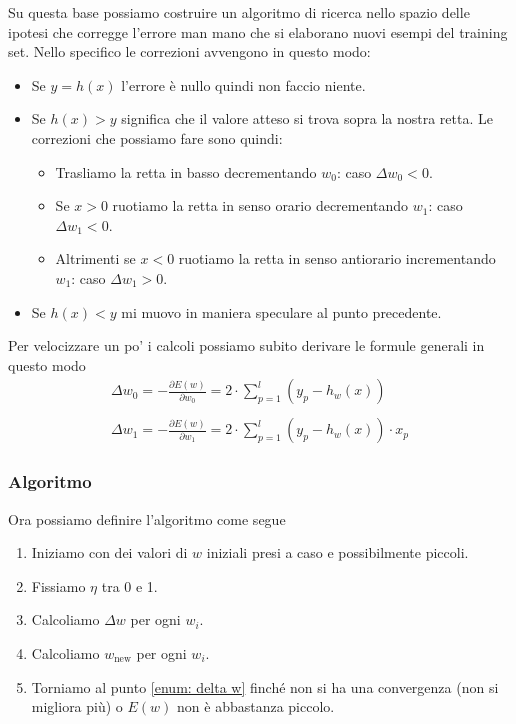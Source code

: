 Su questa base possiamo costruire un algoritmo di ricerca nello spazio delle ipotesi che corregge l'errore man mano che
si elaborano nuovi esempi del training set. Nello specifico le correzioni avvengono in questo modo:
\begin{itemize}
	\item Se $y = h(x)$ l'errore \`e nullo quindi non faccio niente.
	\item Se $h(x) > y$ significa che il valore atteso si trova sopra la nostra retta. Le correzioni che possiamo fare
	      sono quindi:
	      \begin{itemize}
		      \item Trasliamo la retta in basso decrementando $w_0$: caso $\Delta w_0 < 0$.
		      \item Se $x > 0$ ruotiamo la retta in senso orario decrementando $w_1$: caso $\Delta w_1 < 0$.
		      \item Altrimenti se $x < 0$ ruotiamo la retta in senso antiorario incrementando $w_1$: caso $\Delta w_1 > 0$.
	      \end{itemize}
	\item Se $h(x) < y$ mi muovo in maniera speculare al punto precedente.
\end{itemize}
Per velocizzare un po' i calcoli possiamo subito derivare le formule generali in questo modo
\begin{gather*}
	\Delta w_0 = -\frac{\partial E(w)}{\partial w_0} = 2 \cdot \sum_{p=1}^l (y_p - h_w(x)) \\
	\\
	\Delta w_1 = -\frac{\partial E(w)}{\partial w_1} = 2 \cdot \sum_{p=1}^l (y_p - h_w(x)) \cdot x_p
\end{gather*}

\subsubsection{Algoritmo}
Ora possiamo definire l'algoritmo come segue
\begin{enumerate}
	\item Iniziamo con dei valori di $w$ iniziali presi a caso e possibilmente piccoli.
	\item Fissiamo $\eta$ tra 0 e 1.
	\item \label{enum: delta w} Calcoliamo $\Delta w$ per ogni $w_i$.
	\item Calcoliamo $w_\text{new}$ per ogni $w_i$.
	\item Torniamo al punto \ref{enum: delta w} finch\'e non si ha una convergenza (non si migliora pi\`u) o
	      $E(w)$ non \`e abbastanza piccolo.
\end{enumerate}

